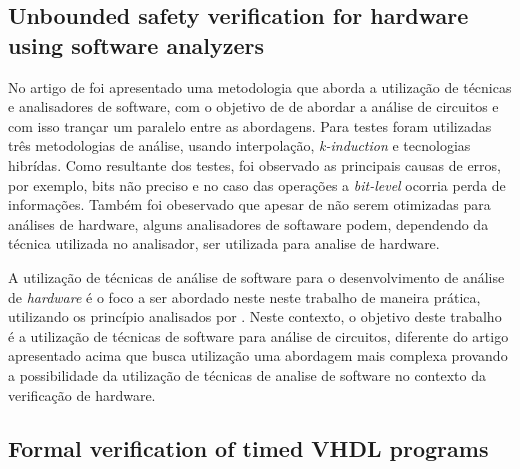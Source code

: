 \subsection{Unbounded safety verification for hardware using software analyzers}

No artigo de \citeauthor{mukherjee2016unbounded} foi apresentado uma metodologia que aborda a utilização de técnicas e analisadores de software, com o objetivo de 
de abordar a análise de circuitos e com isso trançar um paralelo entre as abordagens. Para testes foram utilizadas três metodologias de análise, usando interpolação, \textit{k-induction} e tecnologias hibrídas. Como resultante dos testes, foi observado as principais causas de erros, por exemplo, bits não preciso e no caso das operações a \textit{bit-level} ocorria perda de informações. Também foi obeservado que apesar de não serem otimizadas para análises de hardware, alguns analisadores de softaware podem, dependendo da técnica utilizada no analisador, ser utilizada para analise de hardware.

\par
A utilização de técnicas de análise de software para o desenvolvimento de análise de \textit{hardware} é o foco a ser abordado neste neste trabalho de maneira prática, utilizando os princípio analisados por \cite{mukherjee2016unbounded}. Neste contexto, o objetivo deste trabalho é a utilização de técnicas de software para análise de circuitos, diferente do artigo apresentado acima que busca utilização uma abordagem mais complexa provando a possibilidade da utilização de técnicas de analise de software no contexto da verificação de hardware.


\subsection{Formal verification of timed VHDL programs}

